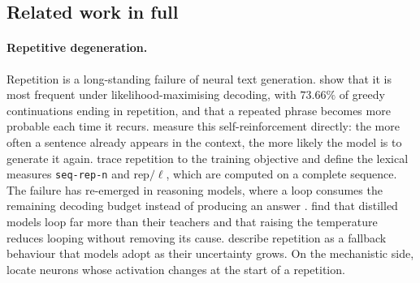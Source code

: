 \subsection{Related work in full}
\label{app:related}

\paragraph{Repetitive degeneration.}
Repetition is a long-standing failure of neural text generation.
\citet{holtzman2020curious} show that it is most frequent under
likelihood-maximising decoding, with $73.66\%$ of greedy continuations ending
in repetition, and that a repeated phrase becomes more probable each time it
recurs. \citet{xu2022learning} measure this self-reinforcement directly: the
more often a sentence already appears in the context, the more likely the model
is to generate it again. \citet{welleck2020neural} trace repetition to the
training objective and define the lexical measures \texttt{seq-rep-n} and
rep$/\ell$, which are computed on a complete sequence. The failure has
re-emerged in reasoning models, where a loop consumes the remaining decoding
budget instead of producing an answer
\citep{xie2025wordsalad,duan2026circular}. \citet{pipis2025wait} find that
distilled models loop far more than their teachers and that raising the
temperature reduces looping without removing its cause.
\citet{ivgi2024loops} describe repetition as a fallback behaviour that models
adopt as their uncertainty grows. On the mechanistic side,
\citet{hiraoka2025repetition} locate neurons whose activation changes at the
start of a repetition.

